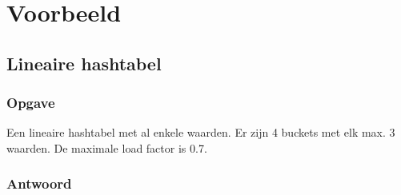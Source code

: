 \documentclass[hashing.tex]{subfiles}
\begin{document}
\chapter{Voorbeeld}
\section{Lineaire hashtabel}
\subsection*{Opgave}
Een lineaire hashtabel met al enkele waarden. Er zijn 4 buckets met elk max. 3 waarden. De maximale load factor is 0.7. 
\subsection*{Antwoord}
\end{document}
